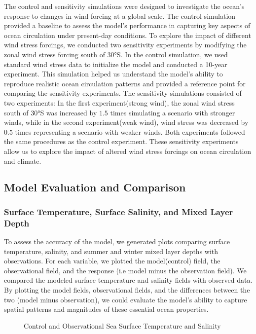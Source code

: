 \documentclass[12pt]{article}
\begin{document}
\noindent The control and sensitivity simulations were designed to investigate the ocean's response to changes in wind forcing at a global scale. The control simulation provided a baseline to assess the model's performance in capturing key aspects of ocean circulation under present-day conditions. To explore the impact of different wind stress forcings, we conducted two sensitivity experiments by modifying the zonal wind stress forcing south of 30°S. In the control simulation, we used standard wind stress data to initialize the model and conducted a 10-year experiment. This simulation helped us understand the model's ability to reproduce realistic ocean circulation patterns and provided a reference point for comparing the sensitivity experiments. The sensitivity simulations consisted of two experiments: In the first experiment(strong wind), the zonal wind stress south of 30°S was increased by $1.5$ times simulating a scenario with stronger winds, while in the second experiment(weak wind), wind stress was decreased by $0.5$ times representing a scenario with weaker winds. Both experiments followed the same procedures as the control experiment. These sensitivity experiments allow us to explore the impact of altered wind stress forcings on ocean circulation and climate.



\subsection{Model Evaluation and Comparison}
\subsubsection{Surface Temperature, Surface Salinity, and Mixed Layer Depth}
To assess the accuracy of the model, we generated plots comparing surface temperature, salinity, and summer and winter mixed layer depths with observations.
For each variable, we plotted the model(control) field, the observational field, and the response (i.e model minus the observation field).  We compared the modeled surface temperature and salinity fields with observed data. By plotting the model fields, observational fields, and the differences between the two (model minus observation), we could evaluate the model's ability to capture spatial patterns and magnitudes of these essential ocean properties. 

\begin{figure}
    \begin{center}
    \caption{Control and Observational Sea Surface Temperature and Salinity}
    \label{fig:firstplot}
    \end{center}
\end{figure}
\end{document}
